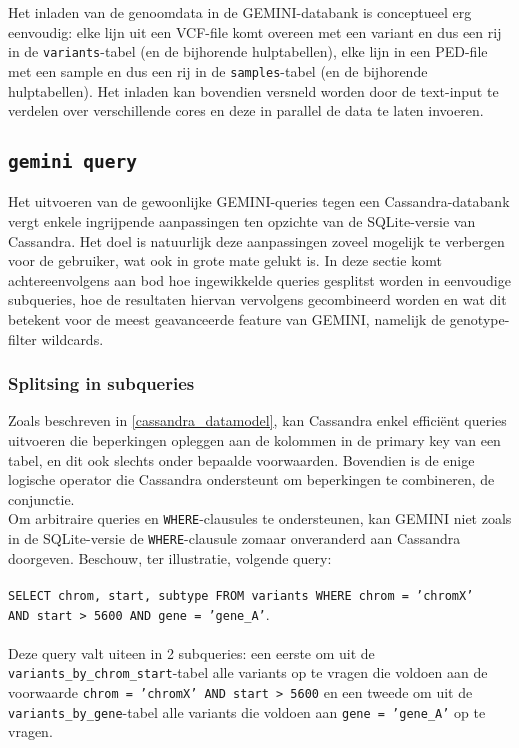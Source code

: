 Het inladen van de genoomdata in de GEMINI-databank is conceptueel erg eenvoudig: elke lijn uit een VCF-file komt overeen met een variant en dus een rij in de \texttt{variants}-tabel (en de bijhorende hulptabellen), elke lijn in een PED-file met een sample en dus een rij in de \texttt{samples}-tabel (en de bijhorende hulptabellen). Het inladen kan bovendien versneld worden door de text-input te verdelen over verschillende cores en deze in parallel de data te laten invoeren.

\subsection{\texttt{gemini query}}
\label{gemini_query_concept}
Het uitvoeren van de gewoonlijke GEMINI-queries tegen een Cassandra-databank vergt enkele ingrijpende aanpassingen ten opzichte van de SQLite-versie van Cassandra. Het doel is natuurlijk deze aanpassingen zoveel mogelijk te verbergen voor de gebruiker, wat ook in grote mate gelukt is. In deze sectie komt achtereenvolgens aan bod hoe ingewikkelde queries gesplitst worden in eenvoudige subqueries, hoe de resultaten hiervan vervolgens gecombineerd worden en wat dit betekent voor de meest geavanceerde feature van GEMINI, namelijk de genotype-filter wildcards.

\subsubsection{Splitsing in subqueries}

Zoals beschreven in \ref{cassandra_datamodel}, kan Cassandra enkel effici\"ent queries uitvoeren die beperkingen opleggen aan de kolommen in de primary key van een tabel, en dit ook slechts onder bepaalde voorwaarden. Bovendien is de enige logische operator die Cassandra ondersteunt om beperkingen te combineren, de conjunctie.\\
Om arbitraire queries en \texttt{WHERE}-clausules te ondersteunen, kan GEMINI niet zoals in de SQLite-versie de \texttt{WHERE}-clausule zomaar onveranderd aan Cassandra doorgeven. Beschouw, ter illustratie, volgende query:\\\\
\texttt{SELECT chrom, start, subtype FROM variants WHERE chrom = 'chromX' \\AND start > 5600 AND gene = 'gene\_A'}.\\\\
Deze query valt uiteen in 2 subqueries: een eerste om uit de \texttt{variants\_by\_chrom\_start}-tabel alle variants op te vragen die voldoen aan de voorwaarde \texttt{chrom = 'chromX' AND start > 5600} en een tweede om uit de \texttt{variants\_by\_gene}-tabel alle variants die voldoen aan \texttt{gene = 'gene\_A'} op te vragen.\\

